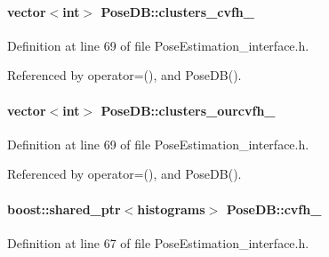 \hypertarget{classPoseDB_a769672c08a62f8f6fc4fcf5f192e10cd}{
\paragraph[{clusters\-\_\-cvfh\-\_\-}]{\setlength{\rightskip}{0pt plus 5cm}vector$<$int$>$ Pose\-D\-B\-::clusters\-\_\-cvfh\-\_\-\hspace{0.3cm}{\ttfamily [private]}}}\label{classPoseDB_a769672c08a62f8f6fc4fcf5f192e10cd}


Definition at line 69 of file Pose\-Estimation\-\_\-interface.\-h.



Referenced by operator=(), and Pose\-D\-B().

\hypertarget{classPoseDB_acad0fbd4acff036f4dad3bfe796d2f1d}{
\paragraph[{clusters\-\_\-ourcvfh\-\_\-}]{\setlength{\rightskip}{0pt plus 5cm}vector$<$int$>$ Pose\-D\-B\-::clusters\-\_\-ourcvfh\-\_\-\hspace{0.3cm}{\ttfamily [private]}}}\label{classPoseDB_acad0fbd4acff036f4dad3bfe796d2f1d}


Definition at line 69 of file Pose\-Estimation\-\_\-interface.\-h.



Referenced by operator=(), and Pose\-D\-B().

\hypertarget{classPoseDB_a64f15c76d07faed58d44fa73fe8081f2}{
\paragraph[{cvfh\-\_\-}]{\setlength{\rightskip}{0pt plus 5cm}boost\-::shared\-\_\-ptr$<${\bf histograms}$>$ Pose\-D\-B\-::cvfh\-\_\-\hspace{0.3cm}{\ttfamily [private]}}}\label{classPoseDB_a64f15c76d07faed58d44fa73fe8081f2}


Definition at line 67 of file Pose\-Estimation\-\_\-interface.\-h.




